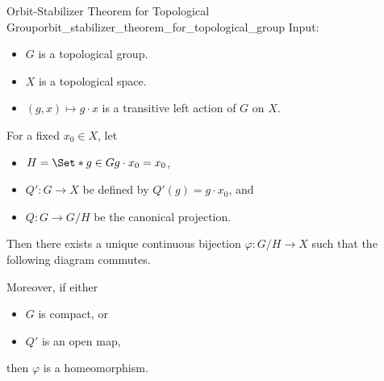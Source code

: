 \documentclass{article}
\begin{document}
\begin{theorem}{Orbit-Stabilizer Theorem for Topological Group}{orbit_stabilizer_theorem_for_topological_group}
    Input:
    \begin{itemize}
        \item $G$ is a topological group.
        \item $X$ is a topological space.
        \item $(g,x)\mapsto g\cdot x$ is a transitive left action of $G$ on $X$.
    \end{itemize}
    For a fixed $x_0\in X$, let
    \begin{itemize}
        \item $H = \Set*{g\in G}{g\cdot x_0 = x_0}$,
        \item $Q':G\rightarrow X$ be defined by $Q'(g) = g\cdot x_0$, and
        \item $Q:G\rightarrow G/H$ be the canonical projection.
    \end{itemize}
    Then there exists a unique continuous bijection $\varphi:G/H\rightarrow X$ such that the following diagram commutes.
    \begin{center}
    \end{center}
    Moreover, if either
    \begin{itemize}
        \item $G$ is compact, or
        \item $Q'$ is an open map,
    \end{itemize}
    then $\varphi$ is a homeomorphism.
\end{theorem}

% 
% 
\end{document}
